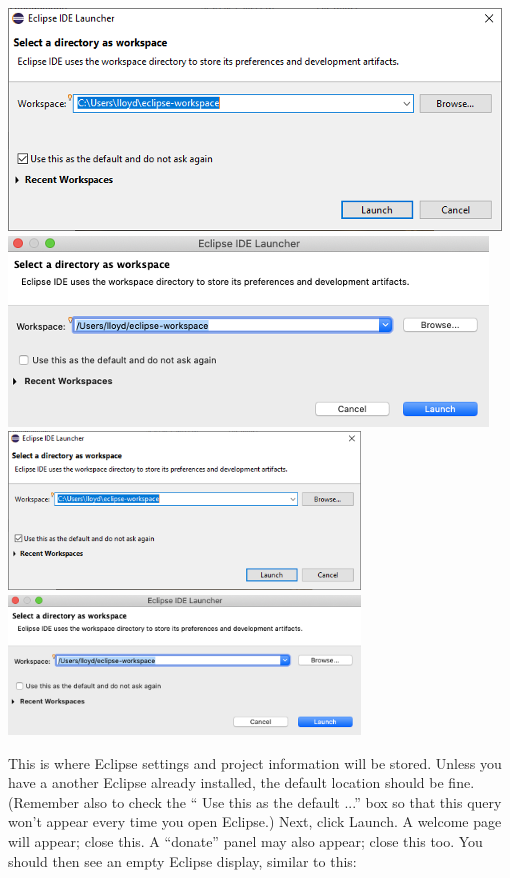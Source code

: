 \begin{center}
\iflatexml
  \ifWindows
     \includegraphics[]{images/EclipseWorkspaceDialog}
  \else
    \includegraphics[]{images/EclipseWorkspaceDialogMacOS}
  \fi
\else
  \ifWindows
     \includegraphics[width=0.7\textwidth]{images/EclipseWorkspaceDialog}
  \else
    \includegraphics[width=0.7\textwidth]{images/EclipseWorkspaceDialogMacOS}
  \fi
\fi
\end{center}
This is where Eclipse settings and project information will be
stored. Unless you have a another Eclipse already installed, the
default location should be fine. (Remember also to check the ``{\sf
Use this as the default ...}''  box so that this query won't appear
every time you open Eclipse.) 
Next, click {\sf Launch}.  A welcome
page will appear; close this. A ``donate'' panel may also appear;
close this too.  You should then see an empty Eclipse display, similar
to this:

